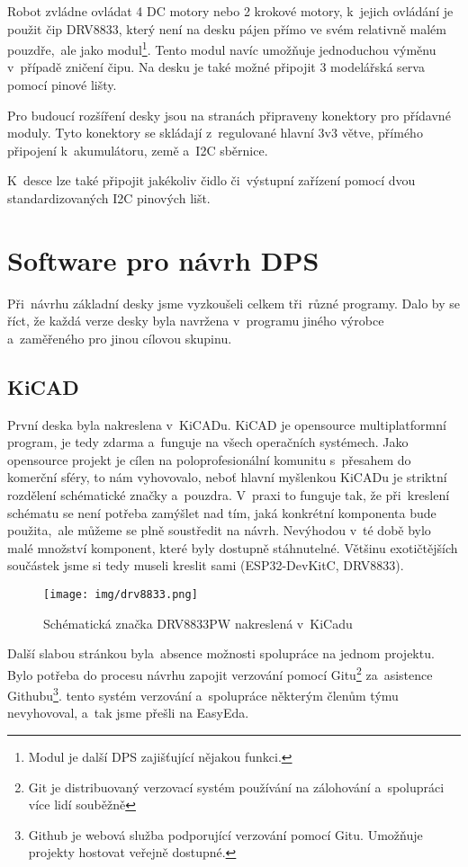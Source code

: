 Robot zvládne ovládat 4 DC motory nebo 2 krokové motory, k~jejich ovládání je použit čip DRV8833\cite{DRV8833}, který není na desku pájen přímo ve svém relativně malém pouzdře,~ale jako modul\footnote{Modul je další DPS zajišťující nějakou funkci.}. Tento modul navíc umožňuje jednoduchou výměnu v~případě zničení čipu. Na desku je také možné připojit 3 modelářská serva pomocí pinové lišty.

Pro budoucí rozšíření desky jsou na stranách připraveny konektory pro přídavné moduly. Tyto konektory se skládají z~regulované hlavní 3v3 větve, přímého připojení k~akumulátoru, země a~I2C sběrnice.

K~desce lze také připojit jakékoliv čidlo či~výstupní zařízení pomocí dvou standardizovaných I2C pinových lišt.

\section{Software pro návrh DPS}
Při~návrhu základní desky jsme vyzkoušeli celkem tři~různé programy. Dalo by se říct, že každá verze desky byla navržena v~programu jiného výrobce a~zaměřeného pro jinou cílovou skupinu.
\subsection{KiCAD}
První deska byla nakreslena v~KiCADu. KiCAD je opensource multiplatformní program, je tedy zdarma a~funguje na všech operačních systémech. Jako opensource projekt je cílen na poloprofesionální komunitu s~přesahem do komerční sféry, to nám vyhovovalo, neboť hlavní myšlenkou KiCADu je striktní rozdělení schématické značky a~pouzdra. V~praxi to funguje tak, že při~kreslení schématu se není potřeba zamýšlet nad tím, jaká konkrétní komponenta bude použita,~ale můžeme se plně soustředit na návrh. Nevýhodou v~té době bylo malé množství komponent, které byly dostupně stáhnutelné. Většinu exotičtějších součástek jsme si tedy museli kreslit sami (ESP32-DevKitC\cite{ESP32}, DRV8833).
\begin{figure}[H]
  	\centering
 	\texttt{[image: img/drv8833.png]}
 	\caption{Schématická značka DRV8833PW nakreslená v~KiCadu}
\end{figure}
Další slabou stránkou byla~absence možnosti spolupráce na jednom projektu. Bylo potřeba do procesu návrhu zapojit verzování pomocí Gitu\footnote{Git je distribuovaný verzovací systém používání na zálohování a~spolupráci více lidí souběžně} za~asistence Githubu\footnote{Github je webová služba podporující verzování pomocí Gitu. Umožňuje projekty hostovat veřejně dostupné.}. tento systém verzování a~spolupráce některým členům týmu nevyhovoval, a~tak jsme přešli na EasyEda.

